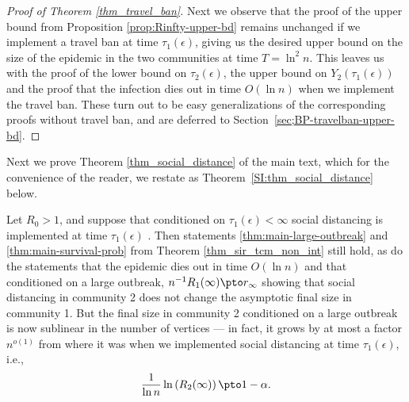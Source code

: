 \documentclass[11pt]{article}
\begin{document}
\begin{proof}[Proof of Theorem \ref{thm_travel_ban}]
Next we observe that the proof of the upper bound 
from Proposition \ref{prop:Rinfty-upper-bd} remains unchanged if we implement a travel ban at time  $\tau_1(\epsilon)$,
giving us the desired upper bound on the size of the epidemic in the two communities at time
$T=\ln^2n$.
This leaves us with the proof of the  lower bound on $\tau_2(\epsilon)$, the upper bound on $Y_2(\tau_1(\epsilon))$ and the proof that the infection dies out in time $O(\ln n)$ when we implement the travel ban.
These turn out to be easy generalizations of the corresponding proofs without travel ban, and are deferred to Section~\ref{sec;BP-travelban-upper-bd}.
\end{proof}



Next we prove  Theorem \ref{thm_social_distance} of the main text, which for the convenience of the reader, we restate as Theorem~\ref{SI:thm_social_distance} below.


\begin{theorem}\label{SI:thm_social_distance}
Let $R_0>1$, and suppose that conditioned on $\tau_1(\epsilon)<\infty$ social distancing is implemented  at time $\tau_1(\epsilon)$ . Then statements \ref{thm:main-large-outbreak} and \ref{thm:main-survival-prob} from Theorem \ref{thm_sir_tcm_non_int} still hold, as do the statements that the epidemic  dies out in time $O(\ln n)$ and that conditioned on a large outbreak, 
$n^{-1}R_1(\infty) \pto r_\infty$  showing that   social distancing in community 2 does not change 
the asymptotic final size in community 1.  But  the final size in community 2 conditioned on a large outbreak is now sublinear in the number of vertices --- in fact, it grows by at most a factor $n^{o(1)}$ from where it was when we implemented social distancing at time $\tau_1(\epsilon)$, i.e.,
     \[
        \frac 1{\ln n}\ln\left(R_2(\infty)\right) \pto 1-\alpha.
    \]
\end{theorem}
\end{document}
